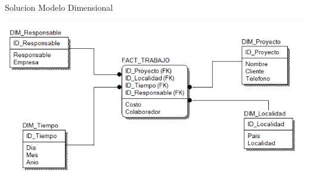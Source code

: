 \documentclass[12pt,letterpaper]{article}
\begin{document}
Solucion
Modelo Dimensional
\begin{center}
\includegraphics[width=17cm]{IMG/ejer3.png} 
\end{center}
 \newpage
\end{document}
